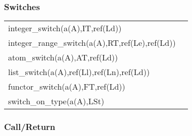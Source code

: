 \subsubsection{Switches}

\begin{tabular}{|l|l|}
\hline
integer_switch(a(A),IT,ref(Ld))         &                 \\
integer_range_switch(a(A),RT,ref(Le),ref(Ld)) &                           \\
atom_switch(a(A),AT,ref(Ld))            &                 \\
list_switch(a(A),ref(Ll),ref(Ln),ref(Ld))&                                \\
functor_switch(a(A),FT,ref(Ld))         &                 \\
switch_on_type(a(A),LSt)                &                 \\
\hline
\end{tabular}

\subsubsection{Call/Return}

